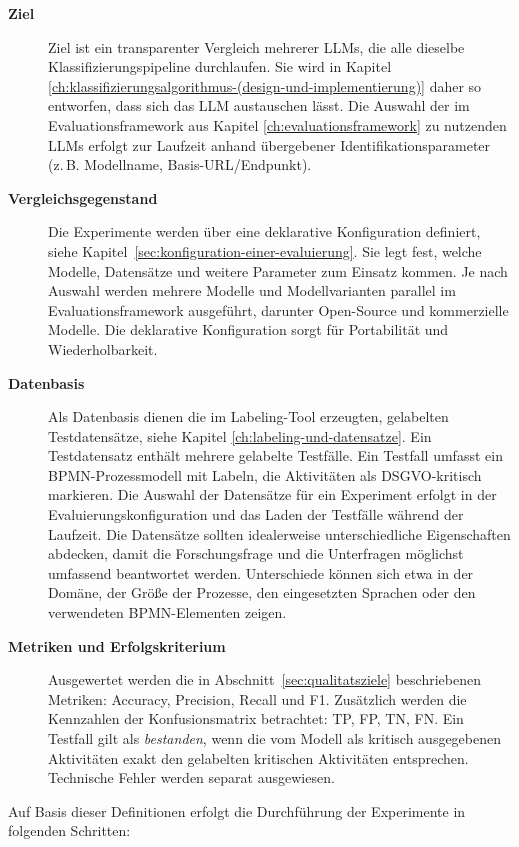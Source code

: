 \begin{description}
    \item[\textbf{Ziel}] Ziel ist ein transparenter Vergleich mehrerer \acp{LLM}, die alle dieselbe Klassifizierungspipeline durchlaufen. Sie wird in Kapitel \ref{ch:klassifizierungsalgorithmus-(design-und-implementierung)} daher so entworfen, dass sich das \ac{LLM} austauschen lässt. Die Auswahl der im Evaluationsframework aus Kapitel \ref{ch:evaluationsframework} zu nutzenden \acp{LLM} erfolgt zur Laufzeit anhand übergebener Identifikationsparameter (z.\,B. Modellname, Basis-URL/Endpunkt).
    \item[\textbf{Vergleichsgegenstand}] Die Experimente werden über eine deklarative Konfiguration definiert, siehe Kapitel~\ref{sec:konfiguration-einer-evaluierung}. Sie legt fest, welche Modelle, Datensätze und weitere Parameter zum Einsatz kommen. Je nach Auswahl werden mehrere Modelle und Modellvarianten parallel im Evaluationsframework ausgeführt, darunter Open-Source und kommerzielle Modelle. Die deklarative Konfiguration sorgt für Portabilität und Wiederholbarkeit.
    \item[\textbf{Datenbasis}] Als Datenbasis dienen die im Labeling-Tool erzeugten, gelabelten Testdatensätze, siehe Kapitel \ref{ch:labeling-und-datensatze}. Ein Testdatensatz enthält mehrere gelabelte Testfälle. Ein Testfall umfasst ein \ac{BPMN}-Prozessmodell mit Labeln, die Aktivitäten als \ac{DSGVO}-kritisch markieren. Die Auswahl der Datensätze für ein Experiment erfolgt in der Evaluierungskonfiguration und das Laden der Testfälle während der Laufzeit. Die Datensätze sollten idealerweise unterschiedliche Eigenschaften abdecken, damit die Forschungsfrage und die Unterfragen möglichst umfassend beantwortet werden. Unterschiede können sich etwa in der Domäne, der Größe der Prozesse, den eingesetzten Sprachen oder den verwendeten \ac{BPMN}-Elementen zeigen.
    \item[\textbf{Metriken und Erfolgskriterium}] Ausgewertet werden die in Abschnitt~\ref{sec:qualitatsziele} beschriebenen Metriken: Accuracy, Precision, Recall und F1. Zusätzlich werden die Kennzahlen der Konfusionsmatrix betrachtet: \ac{TP}, \ac{FP}, \ac{TN}, \ac{FN}. Ein Testfall gilt als \emph{bestanden}, wenn die vom Modell als kritisch ausgegebenen Aktivitäten exakt den gelabelten kritischen Aktivitäten entsprechen. Technische Fehler werden separat ausgewiesen.
\end{description}

Auf Basis dieser Definitionen erfolgt die Durchführung der Experimente in folgenden Schritten:

